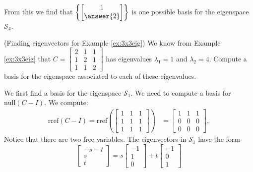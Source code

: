 \documentclass{ximera}
\begin{document}
\begin{example}
\begin{explanation}
From this we find that $\left\{\begin{bmatrix}1\\\answer{2}\end{bmatrix}\right\}$ is one possible basis for the eigenspace $\mathcal{S}_4$.
\end{explanation}
\end{example}
    
\begin{example}\label{ex:eigvectors3x3eig} (Finding eigenvectors for Example \ref{ex:3x3eig})
We know from Example \ref{ex:3x3eig} that $C=\begin{bmatrix} 2 & 1 & 1\\ 1 & 2 & 1\\ 1 & 1 & 2\end{bmatrix}$ has eigenvalues $\lambda_1=1$ and $\lambda_2=4$.  Compute a basis for the eigenspace associated to each of these eigenvalues.
\begin{explanation}
We first find a basis for the eigenspace $\mathcal{S}_1$.  We need to compute a basis for $\mbox{null}(C-I)$.  We compute:
\begin{align*}\mbox{rref}(C-I)=\mbox{rref}\left(\begin{bmatrix} 1 & 1 & 1\\ 1 & 1 & 1\\ 1 & 1 & 1\end{bmatrix}\right)&=\begin{bmatrix} 1 & 1 & 1\\ 0 & 0 & 0\\ 0 & 0 & 0\end{bmatrix},
\end{align*}
Notice that there are two free variables.  %
The eigenvectors in $\mathcal{S}_1$ have the form
$$\begin{bmatrix}-s-t\\s\\t\end{bmatrix} = s\begin{bmatrix}-1\\1\\0\end{bmatrix} + t\begin{bmatrix}-1\\0\\1\end{bmatrix}$$
    

\end{explanation}
\end{example}
\end{document}
